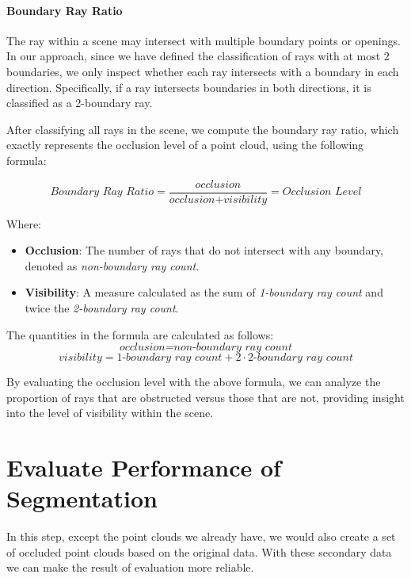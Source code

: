 \documentclass[11pt, a4paper,oneside,chapterprefix=false]{scrbook}
\begin{document}
\paragraph{Boundary Ray Ratio}

The ray within a scene may intersect with multiple boundary points or openings. In our approach, since we have defined the classification of rays with at most 2 boundaries, we only inspect whether each ray intersects with a boundary in each direction. Specifically, if a ray intersects boundaries in both directions, it is classified as a 2-boundary ray.

\vspace{10pt}

After classifying all rays in the scene, we compute the boundary ray ratio, which exactly represents the occlusion level of a point cloud, using the following formula:

\[
\textit{{Boundary Ray Ratio}} = \frac{{\textit{{occlusion}}}}{{\textit{{occlusion}} + \textit{{visibility}}}} = \textit{{Occlusion Level}}
\]

Where:
\begin{itemize}
    \item \textbf{{Occlusion}}: The number of rays that do not intersect with any boundary, denoted as \textit{{non-boundary ray count}}.
    \item \textbf{{Visibility}}: A measure calculated as the sum of \textit{{1-boundary ray count}} and twice the \textit{{2-boundary ray count}}.
\end{itemize}

The quantities in the formula are calculated as follows:
\[
\textit{{occlusion}} = \textit{{non-boundary ray count}}
\]
\[
\textit{{visibility}} = \textit{{1-boundary ray count}} + 2 \cdot \textit{{2-boundary ray count}}
\]

By evaluating the occlusion level with the above formula, we can analyze the proportion of rays that are obstructed versus those that are not, providing insight into the level of visibility within the scene.


\section{Evaluate Performance of Segmentation} \label{evaluate performance of segmentation}

In this step, except the point clouds we already have, we would also create a set of occluded point clouds based on the original data. With these secondary data we can make the result of evaluation more reliable. 
\end{document}
